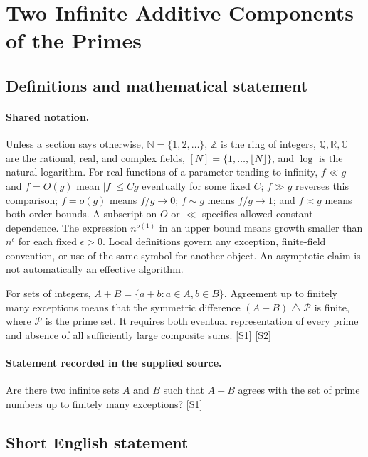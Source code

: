 \documentclass[11pt,a4paper]{article}
\newcommand{\N}{\mathbb{N}}
\newcommand{\Z}{\mathbb{Z}}
\newcommand{\Q}{\mathbb{Q}}
\newcommand{\R}{\mathbb{R}}
\newcommand{\C}{\mathbb{C}}
\newcommand{\sref}[2]{\hyperlink{source:#1:#2}{[S#2]}}
\begin{document}
\section{Two Infinite Additive Components of the Primes}\label{statement}


\subsection{Definitions and mathematical statement}

\paragraph{Shared notation.}Unless a section says otherwise, $\N=\{1,2,\ldots\}$,
$\Z$ is the ring of integers, $\Q,\R,\C$ are the rational, real, and complex
fields, $[N]=\{1,\ldots,\lfloor N\rfloor\}$, and $\log$ is the natural
logarithm. For real functions of a parameter tending to infinity,
$f\ll g$ and $f=O(g)$ mean $|f|\leq Cg$ eventually for some fixed $C$;
$f\gg g$ reverses this comparison; $f=o(g)$ means $f/g\to0$;
$f\sim g$ means $f/g\to1$; and $f\asymp g$ means both order bounds.
A subscript on $O$ or $\ll$ specifies allowed constant dependence.
The expression $n^{o(1)}$ in an upper bound means growth smaller than
$n^\epsilon$ for each fixed $\epsilon>0$. Local definitions govern any
exception, finite-field convention, or use of the same symbol for another
object. An asymptotic claim is not automatically an effective algorithm.



For sets of integers, $A+B=\{a+b:a\in A,b\in B\}$. Agreement up to finitely many exceptions means that the symmetric difference $(A+B)\mathbin{\triangle}\mathcal P$ is finite, where $\mathcal P$ is the prime set. It requires both eventual representation of every prime and absence of all sufficiently large composite sums. \sref{statement}{1} \sref{statement}{2}

\paragraph{Statement recorded in the supplied source.}
Are there two infinite sets $A$ and $B$ such that $A+B$ agrees with the set of prime numbers up to finitely many exceptions? \sref{statement}{1}

\subsection{Short English statement}
\end{document}
